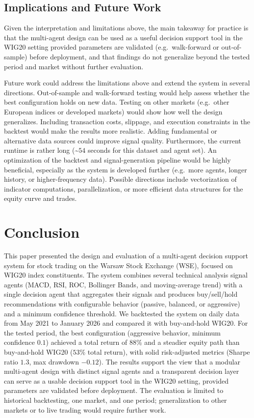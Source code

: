\documentclass{icis}
\begin{document}
\subsection{Implications and Future Work}

Given the interpretation and limitations above, the main takeaway for practice is that the multi-agent design can be used as a useful decision support tool in the WIG20 setting provided parameters are validated (e.g.\ walk-forward or out-of-sample) before deployment, and that findings do not generalize beyond the tested period and market without further evaluation.

Future work could address the limitations above and extend the system in several directions. Out-of-sample and walk-forward testing would help assess whether the best configuration holds on new data. Testing on other markets (e.g.\ other European indices or developed markets) would show how well the design generalizes. Including transaction costs, slippage, and execution constraints in the backtest would make the results more realistic. Adding fundamental or alternative data sources could improve signal quality. Furthermore, the current runtime is rather long (\~{}$54$ seconds for this dataset and agent set). An optimization of the backtest and signal-generation pipeline would be highly beneficial, especially as the system is developed further (e.g.\ more agents, longer history, or higher-frequency data). Possible directions include vectorization of indicator computations, parallelization, or more efficient data structures for the equity curve and trades.

\section{Conclusion}

This paper presented the design and evaluation of a multi-agent decision support system for stock trading on the Warsaw Stock Exchange (WSE), focused on WIG20 index constituents. The system combines several technical analysis signal agents (MACD, RSI, ROC, Bollinger Bands, and moving-average trend) with a single decision agent that aggregates their signals and produces buy/sell/hold recommendations with configurable behavior (passive, balanced, or aggressive) and a minimum confidence threshold. We backtested the system on daily data from May 2021 to January 2026 and compared it with buy-and-hold WIG20. For the tested period, the best configuration (aggressive behavior, minimum confidence $0.1$) achieved a total return of $88$\% and a steadier equity path than buy-and-hold WIG20 ($53$\% total return), with solid risk-adjusted metrics (Sharpe ratio $1.3$, max drawdown $-0.12$). The results support the view that a modular multi-agent design with distinct signal agents and a transparent decision layer can serve as a usable decision support tool in the WIG20 setting, provided parameters are validated before deployment. The evaluation is limited to historical backtesting, one market, and one period; generalization to other markets or to live trading would require further work.
\end{document}
